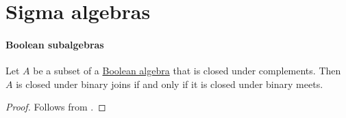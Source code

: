 \section[Sigma algebras]{Sigma algebras}\label{sec:sigma_algebras}

\paragraph{Boolean subalgebras}

\begin{lemma}\label{thm:boolean_subalgebra_binary_de_morgan}
  Let \( A \) be a subset of a \hyperref[def:boolean_algebra]{Boolean algebra} that is closed under complements. Then \( A \) is closed under binary joins if and only if it is closed under binary meets.
\end{lemma}
\begin{proof}
  Follows from .
\end{proof}

